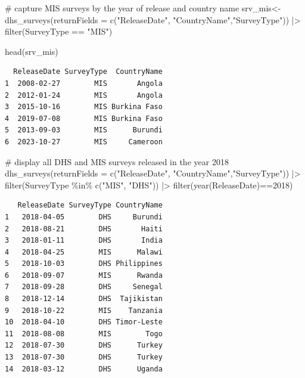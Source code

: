 \documentclass[
  letterpaper,
  DIV=11,
  numbers=noendperiod]{scrreprt}
\newenvironment{Shaded}{\begin{snugshade}}{\end{snugshade}}
\newcommand{\AttributeTok}[1]{\textcolor[rgb]{0.40,0.45,0.13}{#1}}
\newcommand{\CommentTok}[1]{\textcolor[rgb]{0.37,0.37,0.37}{#1}}
\newcommand{\DecValTok}[1]{\textcolor[rgb]{0.68,0.00,0.00}{#1}}
\newcommand{\FunctionTok}[1]{\textcolor[rgb]{0.28,0.35,0.67}{#1}}
\newcommand{\NormalTok}[1]{\textcolor[rgb]{0.00,0.23,0.31}{#1}}
\newcommand{\OtherTok}[1]{\textcolor[rgb]{0.00,0.23,0.31}{#1}}
\newcommand{\SpecialCharTok}[1]{\textcolor[rgb]{0.37,0.37,0.37}{#1}}
\newcommand{\StringTok}[1]{\textcolor[rgb]{0.13,0.47,0.30}{#1}}
\begin{document}
\begin{Shaded}
\begin{Highlighting}[]
\CommentTok{\# capture MIS surveys by the year of release and country name }
\NormalTok{srv\_mis}\OtherTok{\textless{}{-}} \FunctionTok{dhs\_surveys}\NormalTok{(}\AttributeTok{returnFields =}
                        \FunctionTok{c}\NormalTok{(}\StringTok{"ReleaseDate"}\NormalTok{, }\StringTok{"CountryName"}\NormalTok{,}\StringTok{"SurveyType"}\NormalTok{)) }\SpecialCharTok{|\textgreater{}}
  \FunctionTok{filter}\NormalTok{(SurveyType }\SpecialCharTok{==} \StringTok{"MIS"}\NormalTok{)}

\FunctionTok{head}\NormalTok{(srv\_mis)}
\end{Highlighting}
\end{Shaded}

\begin{verbatim}
  ReleaseDate SurveyType  CountryName
1  2008-02-27        MIS       Angola
2  2012-01-24        MIS       Angola
3  2015-10-16        MIS Burkina Faso
4  2019-07-08        MIS Burkina Faso
5  2013-09-03        MIS      Burundi
6  2023-10-27        MIS     Cameroon
\end{verbatim}

\begin{Shaded}
\begin{Highlighting}[]
\CommentTok{\# display all DHS and MIS surveys released in the year 2018}
\FunctionTok{dhs\_surveys}\NormalTok{(}\AttributeTok{returnFields =}
                        \FunctionTok{c}\NormalTok{(}\StringTok{"ReleaseDate"}\NormalTok{, }\StringTok{"CountryName"}\NormalTok{,}\StringTok{"SurveyType"}\NormalTok{)) }\SpecialCharTok{|\textgreater{}}
  \FunctionTok{filter}\NormalTok{(SurveyType }\SpecialCharTok{\%in\%} \FunctionTok{c}\NormalTok{(}\StringTok{"MIS"}\NormalTok{, }\StringTok{"DHS"}\NormalTok{)) }\SpecialCharTok{|\textgreater{}}
  \FunctionTok{filter}\NormalTok{(}\FunctionTok{year}\NormalTok{(ReleaseDate)}\SpecialCharTok{==}\DecValTok{2018}\NormalTok{)}
\end{Highlighting}
\end{Shaded}

\begin{verbatim}
   ReleaseDate SurveyType CountryName
1   2018-04-05        DHS     Burundi
2   2018-08-21        DHS       Haiti
3   2018-01-11        DHS       India
4   2018-04-25        MIS      Malawi
5   2018-10-03        DHS Philippines
6   2018-09-07        MIS      Rwanda
7   2018-09-28        DHS     Senegal
8   2018-12-14        DHS  Tajikistan
9   2018-10-22        MIS    Tanzania
10  2018-04-10        DHS Timor-Leste
11  2018-08-08        MIS        Togo
12  2018-07-30        DHS      Turkey
13  2018-07-30        DHS      Turkey
14  2018-03-12        DHS      Uganda
\end{verbatim}
\end{document}
